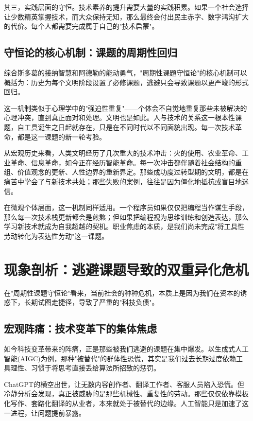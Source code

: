 \documentclass[a4paper,12pt]{ctexart}
\begin{document}
其三，实践层面的守恒。技术素养的提升需要大量的实践积累。如果一个社会选择让少数精英掌握技术，而大众保持无知，那么最终会付出民主赤字、数字鸿沟扩大的代价。每个人都需要完成属于自己的"技术启蒙"。

\subsection{守恒论的核心机制：课题的周期性回归}

综合斯多葛的接纳智慧和阿德勒的能动勇气，"周期性课题守恒论"的核心机制可以概括为：历史为每个文明阶段设置了必修课题，逃避只会导致课题以更严峻的形式回归。

这一机制类似于心理学中的"强迫性重复"——个体会不自觉地重复那些未被解决的心理冲突，直到真正面对和处理。文明也是如此。人与技术的关系这一根本性课题，自工具诞生之日起就存在，只是在不同时代以不同面貌出现。每一次技术革命，都是这一课题的新一轮考验。

从宏观历史来看，人类文明经历了几次重大的技术冲击：火的使用、农业革命、工业革命、信息革命，如今正在经历智能革命。每一次冲击都伴随着社会结构的重组、价值观念的更新、人性边界的重新界定。那些成功度过转型期的文明，都是在痛苦中学会了与新技术共处；那些失败的案例，往往是因为僵化地抵抗或盲目地迷信。

在微观个体层面，这一机制同样适用。一个程序员如果仅仅把编程当作谋生手段，那么每一次技术栈更新都会是煎熬；但如果把编程视为思维训练和创造表达，那么学习新技术就成为自我超越的契机。职业焦虑的本质，是我们尚未完成"将工具性劳动转化为表达性劳动"这一课题。

\section{现象剖析：逃避课题导致的双重异化危机}

在"周期性课题守恒论"看来，当前社会的种种危机，本质上是因为我们在资本的诱惑下，长期试图走捷径，导致了严重的"科技负债"。

\subsection{宏观阵痛：技术变革下的集体焦虑}

如今科技变革带来的阵痛，正是那些被我们逃避的课题在集中爆发。以生成式人工智能(AIGC)为例，那种"被替代"的群体性恐慌，其实是我们过去长期过度依赖工具理性、习惯于将思考直接丢给算法所招致的惩罚。

ChatGPT的横空出世，让无数内容创作者、翻译工作者、客服人员陷入恐慌。但冷静分析会发现，真正被威胁的是那些机械性、重复性的劳动。那些仅仅依靠模板化写作、套路化翻译的从业者，本来就处于被替代的边缘。人工智能只是加速了这一进程，让问题提前暴露。
\end{document}
